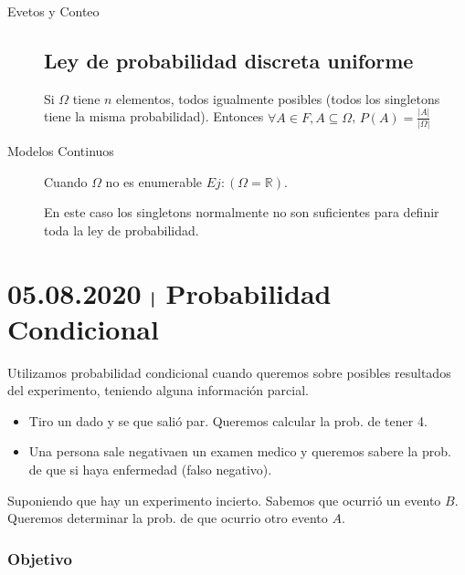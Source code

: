 \documentclass[a4paper]{book}
\begin{document}
\begin{chapter}{Evetos y Conteo}
\begin{description}
           \subsection{Ley de probabilidad discreta uniforme}
           \label{ssec:ley_de_probabilidad_discreta_uniforme}

            Si $\Omega$ tiene $n$ elementos, todos igualmente posibles (todos
            los singletons tiene la misma probabilidad). Entonces $\forall A\in
            F,A\subseteq\Omega$, $P\left(A\right)=\frac{|A|}{|\Omega|}$

        \item[Modelos Continuos] Cuando $\Omega$ no es enumerable
            $Ej:\left(\Omega=\mathbb R\right)$.
            \begin{obs}
            En este caso los singletons normalmente no son suficientes para
                definir toda la ley de probabilidad.
            \end{obs}
    \end{description}

    \section{05.08.2020 $\mybar$ Probabilidad Condicional}
    \label{sec:probabilidad_condicional}

    Utilizamos probabilidad condicional cuando queremos sobre posibles
    resultados del experimento, teniendo alguna información parcial.

    \begin{ej}
    \begin{itemize}
    \item Tiro un dado y se que salió par. Queremos calcular la prob. de tener 4.

    \item Una persona sale negativaen un examen medico y queremos sabere la
        prob. de que si haya enfermedad (falso negativo).
    \end{itemize}
    \end{ej}

    Suponiendo que hay un experimento incierto. Sabemos que ocurrió un evento
    $B$. Queremos determinar la prob. de que ocurrio otro evento $A$.

    \subsubsection{Objetivo}
    \label{ssec:objetivo}


\end{chapter}
\end{document}
